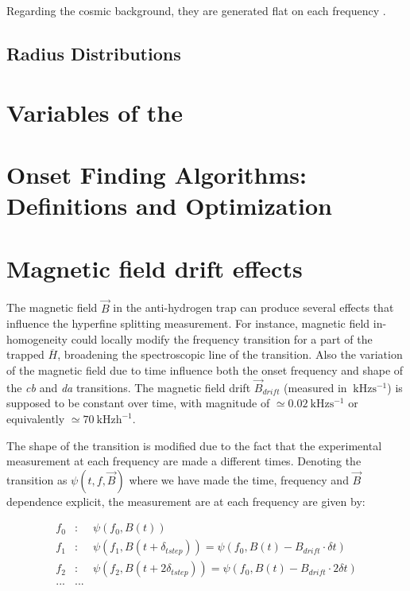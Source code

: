\documentclass[11pt,a4paper,oneside]{article}
\begin{document}
Regarding the cosmic background, they are generated flat on each frequency {\color{red}{together with the background annihilations due to residual gas}}. 

\subsection{Radius Distributions}
 
 
\section{Variables of the }



\section{Onset Finding Algorithms: Definitions and Optimization}

\section{Magnetic field drift effects}

The magnetic field $\vec{B}$ in the anti-hydrogen trap can produce several effects that influence the hyperfine splitting measurement. For instance, magnetic field in-homogeneity could locally modify the frequency transition for a part of the trapped $\overline{H}$, broadening the spectroscopic line of the transition. Also
the variation of the magnetic field due to time influence both the onset frequency and shape of the \textit{cb} and \textit{da} transitions. The magnetic field drift $\vec{B}_{drift}$ (measured in $\SI{}{\kilo \hertz \second\tothe{-1}}$) is supposed to be constant over time, with magnitude of $ \simeq \SI{0.02}{\kilo \hertz \second\tothe{-1}}$ or equivalently $ \simeq \SI{70}{\kilo \hertz \hour\tothe{-1}}$.

The shape of the transition  is modified due to the fact that the experimental measurement at each frequency are made a different times. Denoting the transition as $\psi(t,f,\vec{B})$ where we have made the time, frequency and $\vec{B}$ dependence explicit, the measurement are at each frequency are given by:

\begin{eqnarray*}
f_{0}& : &\psi(f_{0},B(t))   \\
f_{1}& : &\psi(f_{1},B(t + \delta_{tstep})) = \psi(f_{0},B(t) - B_{drift} \cdot \delta t) \\
f_{2}& : &\psi(f_{2},B(t + 2\delta_{tstep})) = \psi(f_{0},B(t) - B_{drift} \cdot 2 \delta t)\\
... & ...
\end{eqnarray*}
\end{document}
